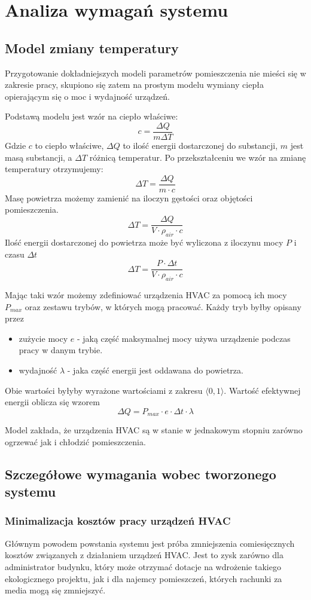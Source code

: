 \chapter{Analiza wymagań systemu}

\section{Model zmiany temperatury}
Przygotowanie dokładniejszych modeli parametrów pomieszczenia nie mieści się w zakresie pracy, skupiono się zatem na prostym modelu wymiany ciepła opierającym się o moc i wydajność urządzeń.

Podstawą modelu jest wzór na ciepło właściwe:
$$ c = \frac{\Delta Q}{m \Delta T} $$
Gdzie $c$ to ciepło właściwe, $\Delta Q$ to ilość energii dostarczonej do substancji, $m$ jest masą substancji, a $\Delta T$ różnicą temperatur.
Po przekształceniu we wzór na zmianę temperatury otrzymujemy:
$$ \Delta T = \frac{\Delta Q}{m \cdot c} $$
Masę powietrza możemy zamienić na iloczyn gęstości oraz objętości pomieszczenia.
$$ \Delta T = \frac{\Delta Q}{V \cdot \rho_{air} \cdot c} $$
Ilość energii dostarczonej do powietrza może być wyliczona z iloczynu mocy $P$ i czasu $\Delta t$
$$ \Delta T = \frac{P \cdot \Delta t}{V \cdot \rho_{air} \cdot c} $$

Mając taki wzór możemy zdefiniować urządzenia HVAC za pomocą ich mocy $P_{max}$ oraz zestawu trybów, w których mogą pracować.
Każdy tryb byłby opisany przez 
\begin{itemize}
    \item zużycie mocy $e$ - jaką część maksymalnej mocy używa urządzenie podczas pracy w danym trybie. 
    \item wydajność $\lambda$ - jaka część energii jest oddawana do powietrza. 
\end{itemize}
Obie wartości byłyby wyrażone wartościami z zakresu $\langle 0,1 \rangle$. Wartość efektywnej energii oblicza się wzorem
$$ \Delta Q = P_{max} \cdot e \cdot \Delta t \cdot \lambda $$

Model zakłada, że urządzenia HVAC są w stanie w jednakowym stopniu zarówno ogrzewać jak i chłodzić pomieszczenia. 

\section{Szczegółowe wymagania wobec tworzonego systemu}
\subsection*{Minimalizacja kosztów pracy urządzeń HVAC}
Głównym powodem powstania systemu jest próba zmniejszenia comiesięcznych kosztów związanych z działaniem urządzeń HVAC. Jest to zysk zarówno dla administrator budynku, który może otrzymać dotacje na wdrożenie takiego ekologicznego projektu, jak i dla najemcy pomieszczeń, których rachunki za media mogą się zmniejszyć.

